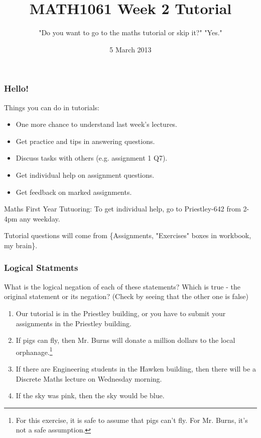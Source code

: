 \documentclass{beamer}
\title{MATH1061 Week 2 Tutorial}
\subtitle{"Do you want to go to the maths tutorial or skip it?"
"Yes."}
\date{5 March 2013}
\begin{document}
\frame{\titlepage}

\begin{frame}
\frametitle{Hello!}

Things you can do in tutorials:
\pause
\begin{itemize}
\item One more chance to understand last week's lectures.
\pause
\item Get practice and tips in answering questions.
\pause
\item Discuss tasks with others (e.g. assignment 1 Q7).
\pause
\item Get individual help on assignment questions.
\pause
\item Get feedback on marked assignments.
\end{itemize}
\pause

Maths First Year Tutuoring: To get individual help, go to
Priestley-642 from 2-4pm any weekday.
\pause

Tutorial questions will come from \{Assignments,
"Exercises" boxes in workbook, my brain\}.


\end{frame}

\begin{frame}
\frametitle{Logical Statments}

What is the logical negation of each of these statements?
Which is true - the original statement or its negation? (Check by seeing that
the other one is false)
\pause

\begin{enumerate}
\item Our tutorial is in the Priestley building, or you have to submit
your assignments in the Priestley building.
\item If pigs can fly, then Mr. Burns will donate a million dollars to the
local orphanage.\footnote{For this exercise, it is safe to assume that pigs
can't fly. For Mr. Burns, it's not a safe assumption.}
\item If there are Engineering students in the Hawken building, then there will
be a Discrete Maths lecture on Wednesday morning.
\item If the sky was pink, then the sky would be blue.
\end{enumerate}

\end{frame}
\end{document}
